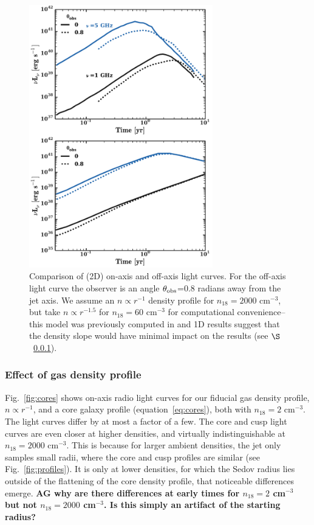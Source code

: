 \documentclass[usenatbib,fleqn]{mnras}
\begin{document}
\begin{figure}
\includegraphics[width=8cm]{on_off.pdf}
\caption{\label{fig:onOff} Comparison of (2D) on-axis and off-axis
  light curves. For the off-axis light curve the observer is an angle
  $\theta_{\rm obs}$=0.8 radians away from the jet axis. We assume an
  $n\propto r^{-1}$ density profile for $n_{18}=2000$ cm$^{-3}$, but
  take $n\propto r^{-1.5}$ for $n_{18}=60$ cm$^{-3}$ for computational
  convenience--this model was previously computed in
  \citet{Mimica+2015} and 1D results suggest that the density slope
  would have minimal impact on the results (see
  $\S$~\ref{sec:profileComp}).}
\end{figure}

\subsubsection{Effect of gas density profile}
\label{sec:profileComp}
Fig.~\ref{fig:cores} shows on-axis radio light curves for our fiducial
gas density profile, $n\propto r^{-1}$, and a core galaxy profile (equation~\ref{eq:cores}),
both with $n_{18}=2$ cm$^{-3}$.  The light curves differ by at most a
factor of a few. The core and cusp light curves are even closer at
higher densities, and virtually indistinguishable at $n_{18}=2000$
cm$^{-3}$. This is because for larger ambient densities, the jet only
samples small radii, where the core and cusp profiles are 
similar (see Fig.~\ref{fig:profiles}). It is only at lower densities,
for which the Sedov radius lies outside of the flattening of the core
density profile, that noticeable differences emerge. {\bf AG why are
  there differences at early times for $n_{18}=2$ cm$^{-3}$ but not
  $n_{18}=2000$ cm$^{-3}$. Is this simply an artifact of the starting
  radius?}
\end{document}
